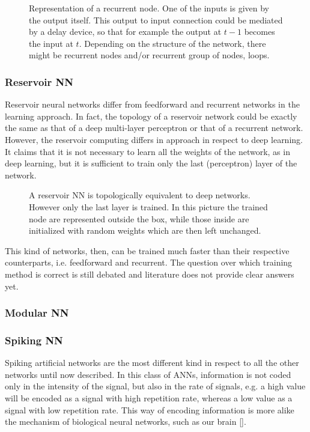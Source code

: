 \begin{figure}[ht]
	\centering
	
	\caption{%
		Representation of a recurrent node.
		One of the inputs is given by the output itself.
		This output to input connection could be mediated by a delay device, so that for example the output at $t-1$ becomes the input at $t$.
		Depending on the structure of the network, there might be recurrent nodes and/or recurrent group of nodes, loops.
		}
	\label{fig:RecurrentNN}
\end{figure}

\subsubsection{Reservoir NN}
\label{sssec:Reservoir_NN}
Reservoir neural networks differ from feedforward and recurrent networks in the learning approach.
In fact, the topology of a reservoir network could be exactly the same as that of a deep multi-layer perceptron or that of a recurrent network.
However, the reservoir computing differs in approach in respect to deep learning.
It claims that it is not necessary to learn all the weights of the network, as in deep learning, but it is sufficient to train only the last (perceptron) layer of the network.

\begin{figure}[ht]
	\centering
	
	\caption{A reservoir NN is topologically equivalent to deep networks. However only the last layer is trained. In this picture the trained node are represented outside the box, while those inside are initialized with random weights which are then left unchanged.}
	\label{fig:reservoirNN}
\end{figure}

\noindent This kind of networks, then, can be trained much faster than their respective counterparts, i.e. feedforward and recurrent.
The question over which training method is correct is still debated and literature does not provide clear answers yet.

\subsubsection{Modular NN}
\label{sec:Modular_NN}


\subsubsection{Spiking NN}
\label{sec:Spiking_NN}
Spiking artificial networks are the most different kind in respect to all the other networks until now described.
In this class of ANNs, information is not coded only in the intensity of the signal, but also in the rate of signals, e.g. a high value will be encoded as a signal with high repetition rate, whereas a low value as a signal with low repetition rate.
This way of encoding information is more alike the mechanism of biological neural networks, such as our brain \ref{}.

